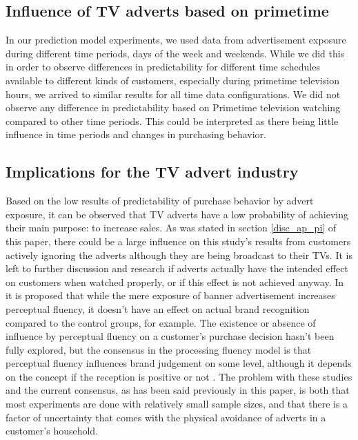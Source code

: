 \documentclass[review]{elsarticle}
\begin{document}
\subsection{Influence of TV adverts based on primetime}
\label{disc_prime}

In our prediction model experiments, we used data from advertisement exposure during different time periods, days of the week and weekends. While we did this in order to observe differences in predictability for different time schedules available to different kinds of customers, especially during primetime television hours, we arrived to similar results for all time data configurations. We did not observe any difference in predictability based on Primetime television watching compared to other time periods. This could be interpreted as there being little influence in time periods and changes in purchasing behavior. 

\subsection{Implications for the TV advert industry}
\label{disc_advert}

Based on the low results of predictability of purchase behavior by advert exposure, it can be observed that TV adverts have a low probability of achieving their main purpose: to increase sales. As was stated in section \ref{disc_ap_pi} of this paper, there could be a large influence on this study's results from customers actively ignoring the adverts although they are being broadcast to their TVs. It is left to further discussion and research if adverts actually have the intended effect on customers when watched properly, or if this effect is not achieved anyway. In \cite[][]{fang} it is proposed that while the mere exposure of banner advertisement increases perceptual fluency, it doesn't have an effect on actual brand recognition compared to the control groups, for example. The existence or absence of influence by perceptual fluency on a customer's purchase decision hasn't been fully explored, but the consensus in the processing fluency model is that perceptual fluency influences brand judgement on some level, although it depends on the concept if the reception is positive or not \cite[][]{lee-a}. The problem with these studies and the current consensus, as has been said previously in this paper, is both that most experiments are done with relatively small sample sizes, and that there is a factor of uncertainty that comes with the physical avoidance of adverts in a customer's household.
\end{document}
